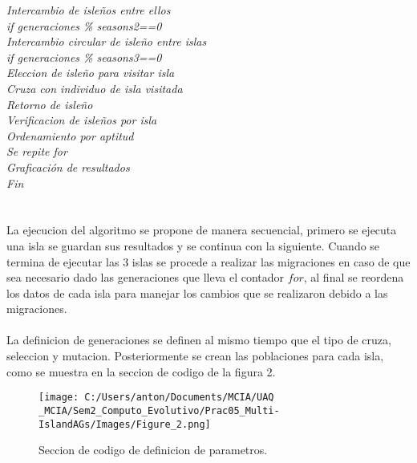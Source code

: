 \documentclass[10pt,letterpaper]{article}
\begin{document}
\hspace*{2cm}\textit{Intercambio de isleños entre ellos}\\
\hspace*{1cm}\textit{if generaciones \% seasons2==0}\\
\hspace*{2cm}\textit{Intercambio circular de isleño entre islas}	\\
\hspace*{1cm}\textit{if generaciones \% seasons3==0}\\
\hspace*{2cm}\textit{Eleccion de isleño para visitar isla}	\\
\hspace*{2cm}\textit{Cruza con individuo de isla visitada}	\\
\hspace*{2cm}\textit{Retorno de isleño}	\\
\hspace*{1cm}\textit{Verificacion de isleños por isla}\\
\hspace*{1cm}\textit{Ordenamiento por aptitud}\\
\hspace*{1cm}\textit{Se repite for}\\
\textit{Graficación de resultados}\\
\textit{Fin}\\
\\\\
La ejecucion del algoritmo se propone de manera secuencial, primero se ejecuta una isla se guardan sus resultados y se continua con la siguiente. Cuando se termina de ejecutar las 3 islas se procede a realizar las migraciones en caso de que sea necesario dado las generaciones que lleva el contador $for$, al final se reordena los datos de cada isla para manejar los cambios que se realizaron debido a las migraciones.
\\\\
La definicion de generaciones se definen al mismo tiempo que el tipo de cruza, seleccion y mutacion. Posteriormente se crean las poblaciones para cada isla, como se muestra en la seccion de codigo de la figura 2.

\begin{figure}[H]
	\centering
    \texttt{[image: C:/Users/anton/Documents/MCIA/UAQ \_MCIA/Sem2\_Computo\_Evolutivo/Prac05\_Multi-IslandAGs/Images/Figure\_2.png]}
    \caption{Seccion de codigo de definicion de parametros.}
\end{figure}
 
\end{document}
